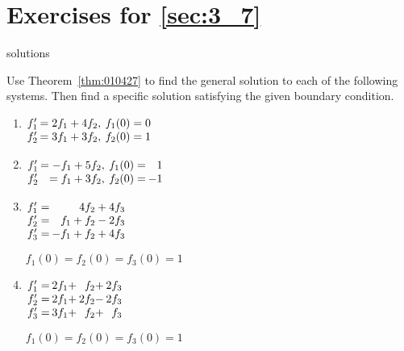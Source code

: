 \section*{Exercises for \ref{sec:3_7}}

\begin{Filesave}{solutions}
\end{Filesave}

\begin{multicols}{2}
\begin{ex}
Use Theorem~\ref{thm:010427}
 to find the general solution to each of the following systems. Then 
find a specific solution satisfying the given boundary condition.


\begin{enumerate}[label={\alph*.}]
\item $\arraycolsep=1pt
\begin{array}[t]{rrrl}
f_1^{\prime} & = 2f_1 + 4f_2, && f_1(0)=0 \\
f_2^{\prime} & = 3f_1 + 3f_2, && f_2(0)=1
\end{array}$


\item $\arraycolsep=1pt
\begin{array}[t]{rrrlr}
f_1^{\prime} & = -f_1 + 5f_2,& & f_1(0)=&1 \\
f_2^{\prime} & = f_1 + 3f_2, && f_2(0)=&-1
\end{array}$


\item $\arraycolsep=1pt
\begin{array}[t]{rr}
f_1^{\prime}  = &  	4f_2 + 4f_3 \\
f_2^{\prime}  = & f_1 + f_2 -2f_3 \\
f_3^{\prime}  = & -f_1 + f_2 +4f_3 \\
\end{array}$

$
f_1(0) = f_2(0) = f_3(0)=1
$


\item $\arraycolsep=1pt
\begin{array}[t]{rlrr}
f_1^{\prime}  = & 2f_1 + &f_2 + &2f_3 \\
f_2^{\prime}  = & 2f_1 + &2f_2 - &2f_3 \\
f_3^{\prime}  = & 3f_1 + &f_2 + &f_3 \\
\end{array}$

$
f_1(0) = f_2(0) = f_3(0)=1
$




\end{enumerate}
\end{ex}
\end{multicols}
